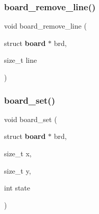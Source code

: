 \mbox{\label{board_8h_a3226412915027b501268d21990806292}} 
\subsubsection{board\+\_\+remove\+\_\+line()}
{\footnotesize\ttfamily void board\+\_\+remove\+\_\+line (\begin{DoxyParamCaption}\item[{struct \textbf{ board} $\ast$}]{brd,  }\item[{size\+\_\+t}]{line }\end{DoxyParamCaption})\hspace{0.3cm}{\ttfamily [inline]}}

\mbox{\label{board_8h_a0a13fafac262382a3d46168a8f3bea62}} 
\subsubsection{board\+\_\+set()}
{\footnotesize\ttfamily void board\+\_\+set (\begin{DoxyParamCaption}\item[{struct \textbf{ board} $\ast$}]{brd,  }\item[{size\+\_\+t}]{x,  }\item[{size\+\_\+t}]{y,  }\item[{int}]{state }\end{DoxyParamCaption})\hspace{0.3cm}{\ttfamily [inline]}}

